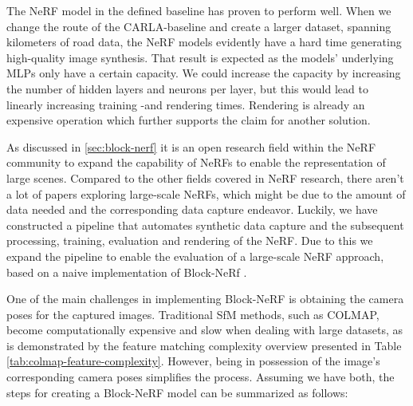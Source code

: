 The NeRF model in the defined baseline has proven to perform well. When we change the route of the CARLA-baseline and create a larger dataset, spanning kilometers of road data, the NeRF models evidently have a hard time generating high-quality image synthesis. That result is expected as the models' underlying MLPs only have a certain capacity. We could increase the capacity by increasing the number of hidden layers and neurons per layer, but this would lead to linearly increasing training -and rendering times. Rendering is already an expensive operation which further supports the claim for another solution.

As discussed in \autoref{sec:block-nerf} it is an open research field within the NeRF community to expand the capability of NeRFs to enable the representation of large scenes. Compared to the other fields covered in NeRF research, there aren't a lot of papers exploring large-scale NeRFs, which might be due to the amount of data needed and the corresponding data capture endeavor. Luckily, we have constructed a pipeline that automates synthetic data capture and the subsequent processing, training, evaluation and rendering of the NeRF. Due to this we expand the pipeline to enable the evaluation of a large-scale NeRF approach, based on a naive implementation of Block-NeRf \cite{tancik_block-nerf_2022}.

One of the main challenges in implementing Block-NeRF is obtaining the camera poses for the captured images. Traditional SfM methods, such as COLMAP, become computationally expensive and slow when dealing with large datasets, as is demonstrated by the feature matching complexity overview presented in Table \ref{tab:colmap-feature-complexity}. However, being in possession of the image's corresponding camera poses simplifies the process. Assuming we have both, the steps for creating a Block-NeRF model can be summarized as follows:


